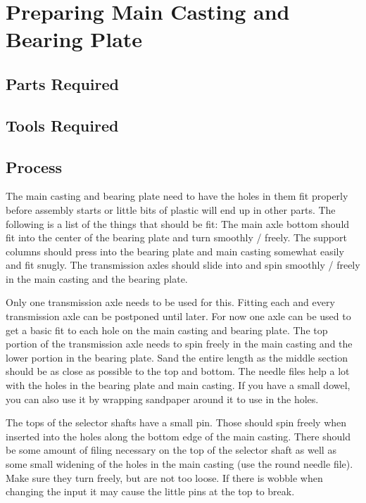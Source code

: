 \documentclass[openany]{book}
\begin{document}
\chapter{Preparing Main Casting and Bearing Plate}
\section{Parts Required}

\section{Tools Required}

\section{Process}

The main casting and bearing plate need to have the holes in them fit properly before assembly starts or little bits of plastic will end up in other parts. The following is a list of the things that should be fit:
The main axle bottom should fit into the center of the bearing plate and turn smoothly / freely.
The support columns should press into the bearing plate and main casting somewhat easily and fit snugly.
The transmission axles should slide into and spin smoothly / freely in the main casting and the bearing plate.

Only one transmission axle needs to be used for this. Fitting each and every transmission axle can be postponed until later. For now one axle can be used to get a basic fit to each hole on the main casting and bearing plate. The top portion of the transmission axle needs to spin freely in the main casting and the lower portion in the bearing plate. Sand the entire length as the middle section should be as close as possible to the top and bottom. The needle files help a lot with the holes in the bearing plate and main casting. If you have a small dowel, you can also use it by wrapping sandpaper around it to use in the holes.

The tops of the selector shafts have a small pin. Those should spin freely when inserted into the holes along the bottom edge of the main casting. There should be some amount of filing necessary on the top of the selector shaft as well as some small widening of the holes in the main casting (use the round needle file). Make sure they turn freely, but are not too loose. If there is wobble when changing the input it may cause the little pins at the top to break.
\end{document}
